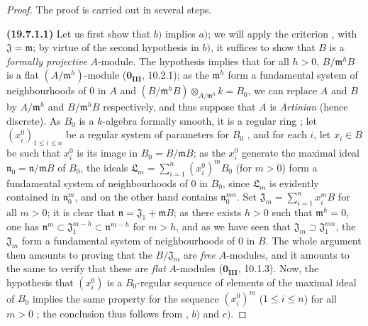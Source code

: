 \begin{proof}
The proof is carried out in several steps.

\medskip
\noindent{}\textbf{(19.7.1.1)}\enspace
Let us first show that $b)$ implies $a)$; we will apply the criterion , with $\mathfrak{J}=\mathfrak{m}$; by virtue of the second hypothesis in $b)$, it suffices to show that $B$ is a \emph{formally projective} $A$-module.
The hypothesis implies that for all $h>0$, $B/\mathfrak{m}^h B$ is a flat $(A/\mathfrak{m}^h)$-module ($\mathbf{0_{III}}$, 10.2.1); as the $\mathfrak{m}^h$ form a fundamental system of neighbourhoods of $0$ in $A$ and $(B/\mathfrak{m}^h B)\otimes_{A/\mathfrak{m}^h} k = B_0$, we can replace $A$ and $B$ by $A/\mathfrak{m}^h$ and $B/\mathfrak{m}^h B$ respectively, and thus suppose that $A$ is \emph{Artinian} (hence discrete).
As $B_0$ is a $k$-algebra formally smooth, it is a regular ring ; let $(x_i^0)_{1\leq i\leq n}$ be a regular system of parameters for $B_0$ ,
and for each $i$, let $x_i\in B$ be such that $x_i^0$ is its image in $B_0=B/\mathfrak{m}B$; as the $x_i^0$ generate the maximal ideal $\mathfrak{n}_0=\mathfrak{n}/\mathfrak{m}B$ of $B_0$, the ideals $\mathfrak{L}_m=\sum_{i=1}^n (x_i^0)^m B_0$ (for $m>0$) form a fundamental system of neighbourhoods of $0$ in $B_0$, since $\mathfrak L_m$ is evidently contained in $\mathfrak{n}_0^m$, and on the other hand contains $\mathfrak{n}_0^{mn}$.
Set $\mathfrak{J}_m=\sum_{i=1}^n x_i^m B$ for all $m>0$;
it is clear that $\mathfrak{n}=\mathfrak{J}_1+\mathfrak{m}B$; as there exists $h>0$ such that $\mathfrak{m}^h=0$, one has $\mathfrak{n}^m\subset\mathfrak{J}_1^{m-h}\subset\mathfrak{n}^{m-h}$ for $m>h$, and as we have seen that $\mathfrak{J}_m\supset\mathfrak{J}_1^{mn}$, the $\mathfrak{J}_m$ form a fundamental system of neighbourhoods of $0$ in $B$.
The whole argument then amounts to proving that the $B/\mathfrak{J}_m$ are \emph{free} $A$-modules, and it amounts to the same to verify that these are \emph{flat} $A$-modules ($\mathbf{0_{III}}$, 10.1.3).
Now, the hypothesis that $(x_i^0)$ is a $B_0$-regular sequence of elements of the maximal ideal of $B_0$ implies the same property for the sequence $(x_i^0)^m$ ($1\leq i\leq n$) for all $m>0$ ; the conclusion thus follows from , $b)$ and $c)$.
\end{proof}

